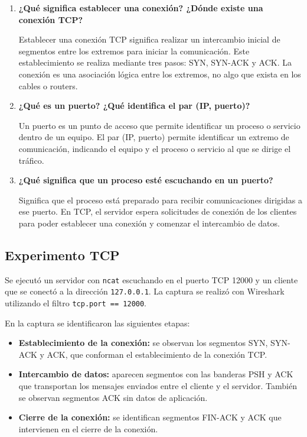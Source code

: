 \documentclass[11pt,a4paper]{article}
\begin{document}
\begin{enumerate}[label=\alph*)]

\item \textbf{¿Qué significa establecer una conexión? ¿Dónde existe una conexión TCP?}

Establecer una conexión TCP significa realizar un intercambio inicial de segmentos entre los extremos para iniciar la comunicación. Este establecimiento se realiza mediante tres pasos: SYN, SYN-ACK y ACK. La conexión es una asociación lógica entre los extremos, no algo que exista en los cables o routers.

\item \textbf{¿Qué es un puerto? ¿Qué identifica el par (IP, puerto)?}

Un puerto es un punto de acceso que permite identificar un proceso o servicio dentro de un equipo. El par (IP, puerto) permite identificar un extremo de comunicación, indicando el equipo y el proceso o servicio al que se dirige el tráfico.

\item \textbf{¿Qué significa que un proceso esté escuchando en un puerto?}

Significa que el proceso está preparado para recibir comunicaciones dirigidas a ese puerto. En TCP, el servidor espera solicitudes de conexión de los clientes para poder establecer una conexión y comenzar el intercambio de datos.

\end{enumerate}

\subsection*{Experimento TCP}

Se ejecutó un servidor con \texttt{ncat} escuchando en el puerto TCP 12000 y un cliente que se conectó a la dirección \texttt{127.0.0.1}. La captura se realizó con Wireshark utilizando el filtro \texttt{tcp.port == 12000}.

En la captura se identificaron las siguientes etapas:

\begin{itemize}
  \item \textbf{Establecimiento de la conexión:} se observan los segmentos SYN, SYN-ACK y ACK, que conforman el establecimiento de la conexión TCP.
  \item \textbf{Intercambio de datos:} aparecen segmentos con las banderas PSH y ACK que transportan los mensajes enviados entre el cliente y el servidor. También se observan segmentos ACK sin datos de aplicación.
  \item \textbf{Cierre de la conexión:} se identifican segmentos FIN-ACK y ACK que intervienen en el cierre de la conexión.
\end{itemize}
\end{document}
